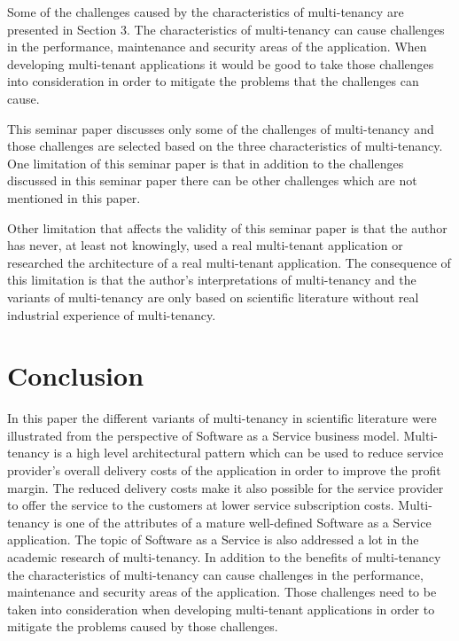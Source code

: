 \documentclass[conference]{sasmoota2017}
\begin{document}
Some of the challenges caused by the characteristics of multi-tenancy are presented in Section 3. The characteristics of multi-tenancy can cause challenges in the performance, maintenance and security areas of the application. When developing multi-tenant applications it would be good to take those challenges into consideration in order to mitigate the problems that the challenges can cause. 

This seminar paper discusses only some of the challenges of multi-tenancy and those challenges are selected based on the three characteristics of multi-tenancy. One limitation of this seminar paper is that in addition to the challenges discussed in this seminar paper there can be other challenges which are not mentioned in this paper. 

Other limitation that affects the validity of this seminar paper is that the author has never, at least not knowingly, used a real multi-tenant application or researched the architecture of a real multi-tenant application. The consequence of this limitation is that the author's interpretations of multi-tenancy and the variants of multi-tenancy are only based on scientific literature without real industrial experience of multi-tenancy. 

\section{Conclusion}

In this paper the different variants of multi-tenancy in scientific literature were illustrated from the perspective of Software as a Service business model. Multi-tenancy is a high level architectural pattern which can be used to reduce service provider's overall delivery costs of the application in order to improve the profit margin. The reduced delivery costs make it also possible for the service provider to offer the service to the customers at lower service subscription costs. Multi-tenancy is one of the attributes of a mature well-defined Software as a Service application. The topic of Software as a Service is also addressed a lot in the academic research of multi-tenancy. In addition to the benefits of multi-tenancy the characteristics of multi-tenancy can cause challenges in the performance, maintenance and security areas of the application. Those challenges need to be taken into consideration when developing multi-tenant applications in order to mitigate the problems caused by those challenges. 
\end{document}

